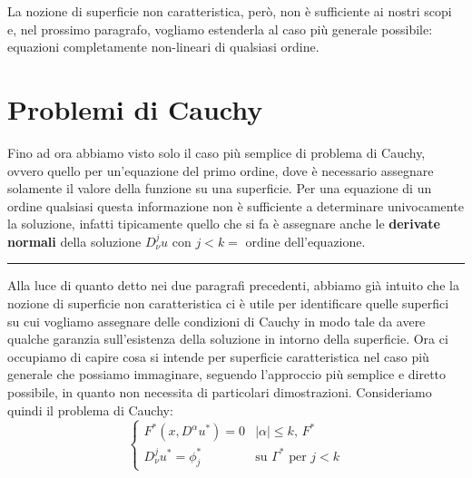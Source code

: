 La nozione di superficie non caratteristica, però, non è sufficiente ai nostri scopi e, nel prossimo paragrafo, vogliamo estenderla al caso più generale possibile: equazioni completamente non-lineari di qualsiasi ordine.

\newpage
\section{Problemi di Cauchy} \label{pb}

Fino ad ora abbiamo visto solo il caso più semplice di problema di Cauchy, ovvero quello per un'equazione del primo ordine, dove è necessario assegnare solamente il valore della funzione su una superficie. Per una equazione di un ordine qualsiasi questa informazione non è sufficiente a determinare univocamente la soluzione, infatti tipicamente quello che si fa è assegnare anche le \textbf{derivate normali} della soluzione $D^j_\nu u$ con $j<k=$ ordine dell'equazione. 

\noindent\rule[0.5ex]{\linewidth}{0.2pt}

Alla luce di quanto detto nei due paragrafi precedenti, abbiamo già intuito che la nozione di superficie non caratteristica ci è utile per identificare quelle superfici su cui vogliamo assegnare delle condizioni di Cauchy in modo tale da avere qualche garanzia sull'esistenza della soluzione in intorno della superficie. Ora ci occupiamo di capire cosa si intende per superficie caratteristica nel caso più generale che possiamo immaginare, seguendo l'approccio più semplice e diretto possibile, in quanto non necessita di particolari dimostrazioni.
Consideriamo quindi il problema di Cauchy:
\begin{equation}
\begin{cases}
F^*(x,D^\alpha u^*)=0 & |\alpha | \leq k, \, F^*\\
D^j_\nu u^* = \phi_j^* & \text{su } \Gamma^* \text{ per }j<k 
\end{cases}
\end{equation}

